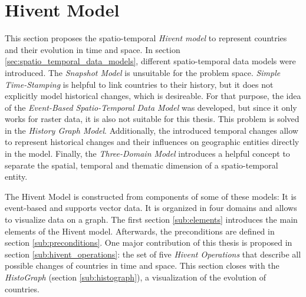 

\section{Hivent Model} %
\label{sec:hivent_model}

This section proposes the spatio-temporal \emph{Hivent model} to represent countries and their evolution in time and space. In section \ref{sec:spatio_temporal_data_models}, different spatio-temporal data models were introduced. The \emph{Snapshot Model} is unsuitable for the problem space. \emph{Simple Time-Stamping} is helpful to link countries to their history, but it does not explicitly model historical changes, which is desireable. For that purpose, the idea of the \emph{Event-Based Spatio-Temporal Data Model} was developed, but since it only works for raster data, it is also not suitable for this thesis. This problem is solved in the \emph{History Graph Model}. Additionally, the introduced temporal changes allow to represent historical changes and their influences on geographic entities directly in the model. Finally, the \emph{Three-Domain Model} introduces a helpful concept to separate the spatial, temporal and thematic dimension of a spatio-temporal entity.

The Hivent Model is constructed from components of some of these models: It is event-based and supports vector data. It is organized in four domains and allows to visualize data on a graph. The first section \ref{sub:elements} introduces the main elements of the Hivent model. Afterwards, the preconditions are defined in section \ref{sub:preconditions}. One major contribution of this thesis is proposed in section \ref{sub:hivent_operations}: the set of five \emph{Hivent Operations} that describe all possible changes of countries in time and space. This section closes with the \emph{HistoGraph} (section \ref{sub:histograph}), a visualization of the evolution of countries.

